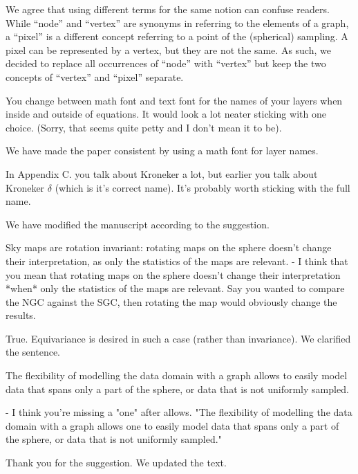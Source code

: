 \documentclass[12pt,a4paper]{article}
\newcommand{\nati}[1]{{\color[rgb]{.1,.6,.1}{NP: #1}}}
\newcommand{\mdeff}[1]{{\color[rgb]{.1,.6,.1}{MD: #1}}}
\newcommand{\TK}[1]{{\color{red}{TK: #1}}}
\newcommand{\1}{\b{1}}              %
\newcommand{\0}{\b{0}}              %
\begin{document}
We agree that using different terms for the same notion can confuse readers.
While ``node'' and ``vertex'' are synonyms in referring to the elements of a graph, a ``pixel'' is a different concept referring to a point of the (spherical) sampling.
A pixel can be represented by a vertex, but they are not the same.
As such, we decided to replace all occurrences of ``node'' with ``vertex'' but keep the two concepts of ``vertex'' and ``pixel'' separate.


\begin{mdframed}[style=comment]
You change between math font and text font for the names of your layers when inside and outside of equations. It would look a lot neater sticking with one choice. (Sorry, that seems quite petty and I don't mean it to be).
\end{mdframed}
We have made the paper consistent by using a math font for layer names.

\begin{mdframed}[style=comment]
In Appendix C. you talk about Kroneker a lot, but earlier you talk about Kroneker $\delta$ (which is it's correct name). It's probably worth sticking with the full name.
\end{mdframed}
We have modified the manuscript according to the suggestion.

\begin{mdframed}[style=comment]
Sky maps are rotation invariant: rotating maps on the sphere doesn’t change their interpretation, as only the statistics of the maps are relevant.
- I think that you mean that rotating maps on the sphere doesn't change their interpretation *when* only the statistics of the maps are relevant. Say you wanted to compare the NGC against the SGC, then rotating the map would obviously change the results.
\end{mdframed}
True.
Equivariance is desired in such a case (rather than invariance).
We clarified the sentence.

\begin{mdframed}[style=comment]
The flexibility of modelling the data domain with a graph allows to easily model data that spans only a part of the sphere, or data that is not uniformly sampled.

- I think you're missing a "one" after allows. "The flexibility of modelling the data domain with a graph allows one to easily model data that spans only a part of the sphere, or data that is not uniformly sampled."
\end{mdframed}
Thank you for the suggestion. We updated the text.
\end{document}

